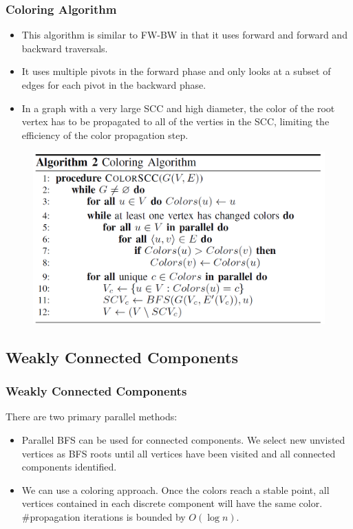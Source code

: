 \begin{frame}
	\frametitle{Coloring Algorithm}
	\begin{itemize}
		\setlength\itemsep{1em}
		\item This algorithm is similar to FW-BW in that it uses forward and 
			forward and backward traversals.
		\item It uses multiple pivots in the forward phase and only looks at a 
			subset of edges for each pivot in the backward phase.
		\item In a graph with a very large SCC and high diameter, the color of
			the root vertex has to be propagated to all of the verties in the
			SCC, limiting the efficiency of the color propagation step.
	\end{itemize}
\end{frame}

\begin{frame}
	\begin{figure}
		\includegraphics[scale=0.30]{figure/fig-Coloring.png}
	\end{figure}
\end{frame}

\subsection{Weakly Connected Components}
\begin{frame}
	\frametitle{Weakly Connected Components}
	There are two primary parallel methods:
	\begin{itemize}
		\setlength\itemsep{1em}
		\item Parallel BFS can be used for connected components. 
			We select new unvisted vertices as BFS roots until all vertices 
			have been visited and all connected components identified.
		\item We can use a coloring approach. Once the colors reach 
			a stable point, all vertices contained in each discrete 
			component will have the same color. \#propagation iterations 
			is bounded by $O(\log n)$.
	\end{itemize}
\end{frame}

